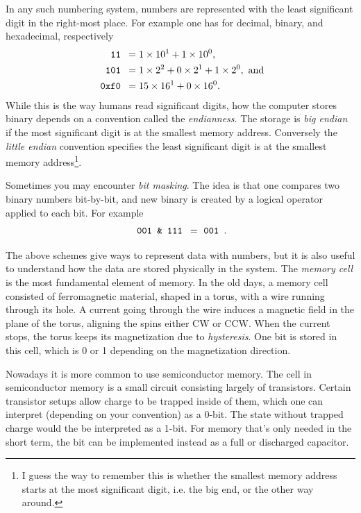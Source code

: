 In any such numbering system, numbers are represented with the least significant
digit in the right-most place. For example one has for decimal, binary, and
hexadecimal, respectively
\begin{equation*}\begin{aligned}
  \ff{11} &= 1\times10^1+1\times10^0, \\
  \ff{101} &= 1\times2^2+0\times2^1+1\times2^0,~\text{and} \\
  \ff{0xf0} &= 15\times16^1+0\times16^0.
\end{aligned}\end{equation*}
While this is the way humans read significant digits, how the computer stores
binary depends on a convention called the {\it endianness}.
The storage is {\it big endian}  if the most significant digit 
is at the smallest memory address. Conversely the
{\it little endian}  convention specifies the least
significant digit is at the smallest memory address\footnote{I guess the way
to remember this is whether the smallest memory address starts at the most
significant digit, i.e. the big end, or the other way around.}.

Sometimes you may encounter {\it bit masking}. The idea is that one compares
two binary numbers bit-by-bit, and new binary is created by a logical operator
applied to each bit. For example
\begin{equation*}
  \ff{001 \& 111} = \ff{001}. 
\end{equation*}

The above schemes give ways to represent data with numbers, but it is also
useful to understand how the data are stored physically in the system.
The {\it memory cell} is the most fundamental element of memory. In the old
days, a memory cell consisted of ferromagnetic material, shaped in a torus, with
a wire running through its hole. A current going through the wire induces a
magnetic field in the plane of the torus, aligning the spins either CW or CCW.
When the current stops, the torus keeps its magnetization due to 
{\it hysteresis}. One bit is stored in this cell, which is 0
or 1 depending on the magnetization direction.

Nowadays it is more common to use semiconductor memory. The cell in
semiconductor memory is a small circuit consisting largely of transistors.
Certain transistor setups allow charge to be trapped inside of them,
which one can interpret (depending on your convention) as a 0-bit. The state
without trapped charge would the be interpreted as a 1-bit.
For memory that's only needed in the short term, the bit can be implemented 
instead as a full or discharged capacitor.

